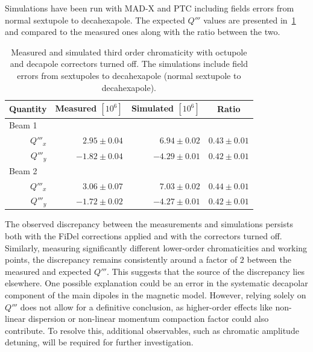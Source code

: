 Simulations have been run with MAD-X and PTC including fields errors from normal sextupole to 
decahexapole. The expected $Q'''$ values are presented
in~\cref{table:decapoles:bare_chromaticity:virgin_dq3} and compared to the measured ones along with
the ratio between the two.

\begin{table}[tbh]
    \centering
    \begin{tabular}{rrrc}
    \hline
        \toprule
        Quantity  &  Measured $[10^6]$        &  Simulated $[10^{6}]$          &   Ratio       \\
        \midrule
        \multicolumn{1}{l}{Beam 1}    &                           &                                &               \\
         $Q'''_x$ &     $ 2.95 \pm 0.04$      &       $ 6.94 \pm 0.02$         &  $0.43 \pm 0.01$\\
         $Q'''_y$ &     $-1.82 \pm 0.04$      &       $-4.29 \pm 0.01$         &  $0.42 \pm 0.01$\\
        \multicolumn{1}{l}{Beam 2}    &                           &                                &               \\
         $Q'''_x$ &     $ 3.06 \pm 0.07$      &       $ 7.03 \pm 0.02$         &  $0.44 \pm 0.01$\\
         $Q'''_y$ &     $-1.72 \pm 0.02$      &       $-4.27 \pm 0.01$         &  $0.42 \pm 0.01$\\
         \bottomrule
    \end{tabular}
    \caption{Measured and simulated third order chromaticity with octupole and decapole correctors
    turned off. The simulations include field errors from sextupoles to decahexapole (normal
    sextupole to decahexapole).}
    \label{table:decapoles:bare_chromaticity:virgin_dq3}
\end{table}

The observed discrepancy between the measurements and simulations persists both with the FiDel 
corrections applied and with the correctors turned off. Similarly, measuring significantly different 
lower-order chromaticities and working points, the discrepancy remains consistently around a factor 
of $2$ between the measured and expected $Q'''$. This suggests that the source of the discrepancy lies 
elsewhere. One possible explanation could be an error in the systematic decapolar component of the 
main dipoles in the magnetic model. However, relying solely on $Q'''$ does not allow for a definitive 
conclusion, as higher-order effects like non-linear dispersion or non-linear momentum compaction
factor could also contribute. To resolve this, additional observables, such as chromatic amplitude
detuning, will be required for further investigation.


\FloatBarrier